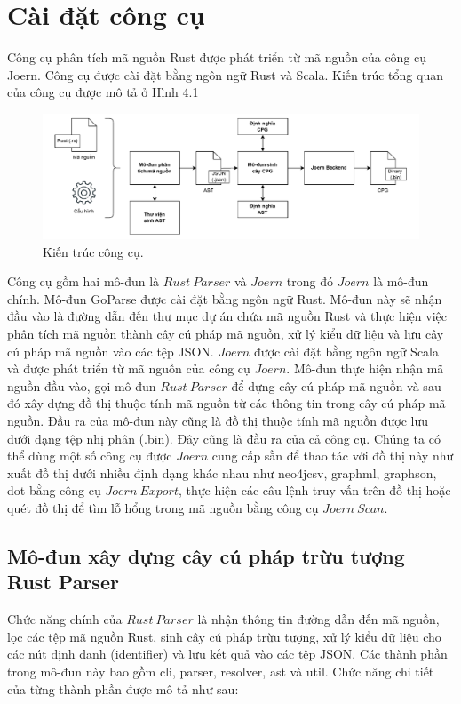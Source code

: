\section{Cài đặt công cụ}

Công cụ phân tích mã nguồn Rust được phát triển từ mã nguồn của công cụ Joern.
Công cụ được cài đặt bằng ngôn ngữ Rust và Scala. Kiến trúc tổng quan của công cụ được
mô tả ở Hình 4.1

\begin{figure}[H]
	\includegraphics[width=1\columnwidth]{figures/c4/c4_install_flow.drawio.pdf}
	\centering
	\caption{Kiến trúc công cụ.}
	\label{img:c4_install_flow}
\end{figure}

Công cụ gồm hai mô-đun là $Rust\ Parser$ và $Joern$ trong đó $Joern$ là mô-đun
chính. Mô-đun GoParse được cài đặt bằng ngôn ngữ Rust. Mô-đun này sẽ nhận đầu vào là
đường dẫn đến thư mục dự án chứa mã nguồn Rust và thực hiện việc phân tích mã nguồn
thành cây cú pháp mã nguồn, xử lý kiểu dữ liệu và lưu cây cú pháp mã nguồn vào các
tệp JSON. $Joern$ được cài đặt bằng ngôn ngữ Scala và được phát triển từ mã nguồn
của công cụ $Joern$. Mô-đun thực hiện nhận mã nguồn đầu vào, gọi mô-đun $Rust\ Parser$ để
dựng cây cú pháp mã nguồn và sau đó xây dựng đồ thị thuộc tính mã nguồn từ các thông
tin trong cây cú pháp mã nguồn. Đầu ra của mô-đun này cũng là đồ thị thuộc tính mã
nguồn được lưu dưới dạng tệp nhị phân (.bin). Đây cũng là đầu ra của cả công cụ. Chúng
ta có thể dùng một số công cụ được $Joern$ cung cấp sẵn để thao tác với đồ thị này như xuất đồ thị dưới nhiều định dạng khác nhau như neo4jcsv, graphml, graphson, dot bằng
công cụ $Joern\ Export$, thực hiện các câu lệnh truy vấn trên đồ thị hoặc quét đồ thị để tìm
lỗ hổng trong mã nguồn bằng công cụ $Joern\ Scan$.

\subsection{Mô-đun xây dựng cây cú pháp trừu tượng Rust Parser}

Chức năng chính của $Rust\ Parser$ là nhận thông tin đường dẫn đến mã nguồn, lọc các
tệp mã nguồn Rust, sinh cây cú pháp trừu tượng, xử lý kiểu dữ liệu cho các nút định danh
(identifier) và lưu kết quả vào các tệp JSON. Các thành phần trong mô-đun này bao gồm
cli, parser, resolver, ast và util. Chức năng chi tiết của từng thành phần được mô tả như
sau:


